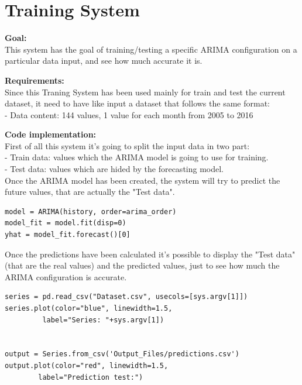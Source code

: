  
 
\newpage
\section{Training System}
\textbf{Goal:}\\ 
This system has the goal of training/testing a specific ARIMA configuration on a particular data input, and see how much accurate it is. 

\textbf{Requirements:}\\
Since this Traning System has been used mainly for train and test the current dataset, it need to have like input a dataset that follows the same format:\\
- Data content: 144 values, 1 value for each month from 2005 to 2016

\textbf{Code implementation:}\\
First of all this system it's going to split the input data in two part:\\
- Train data: values which the ARIMA model is going to use for training. \\
- Test data: values which are hided by the forecasting model. \\
Once the ARIMA model has been created, the system will try to predict the future values, that are actually the "Test data".\\

\begin{lstlisting}
model = ARIMA(history, order=arima_order)
model_fit = model.fit(disp=0)
yhat = model_fit.forecast()[0]
\end{lstlisting}

Once the predictions have been calculated it's possible to display the "Test data" (that are the real values) and the predicted values, just to see how much the ARIMA configuration is accurate.

\begin{lstlisting}
series = pd.read_csv("Dataset.csv", usecols=[sys.argv[1]])
series.plot(color="blue", linewidth=1.5,
		 label="Series: "+sys.argv[1])


output = Series.from_csv('Output_Files/predictions.csv')
output.plot(color="red", linewidth=1.5,
		label="Prediction test:")
\end{lstlisting}

\newpage

